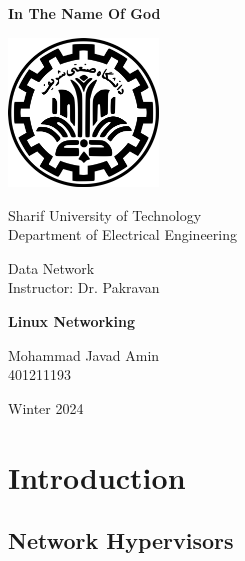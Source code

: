 \documentclass{report}
\begin{document}
\begin{titlepage}
    \begin{center}
        {\small \textbf{In The Name Of God}}

        \vspace{1cm}

        \includegraphics[width=0.3\textwidth]{logo.png} 

        \vspace{1cm}

        {\Huge Sharif University of Technology \\ Department of Electrical Engineering}

        \vspace{4cm}

        {\Large Data Network \\ 
        Instructor: Dr. Pakravan }
        
        \vspace{2cm}
        {\large \textbf{Linux Networking }}

        \vspace{4cm}

        {\Large Mohammad Javad Amin \\
        401211193}

        \vspace{3cm}

        {\Large Winter 2024}
    \end{center}
\end{titlepage}

\newpage

\tableofcontents

\newpage
\chapter*{Introduction}


\section*{Network Hypervisors}
\end{document}

